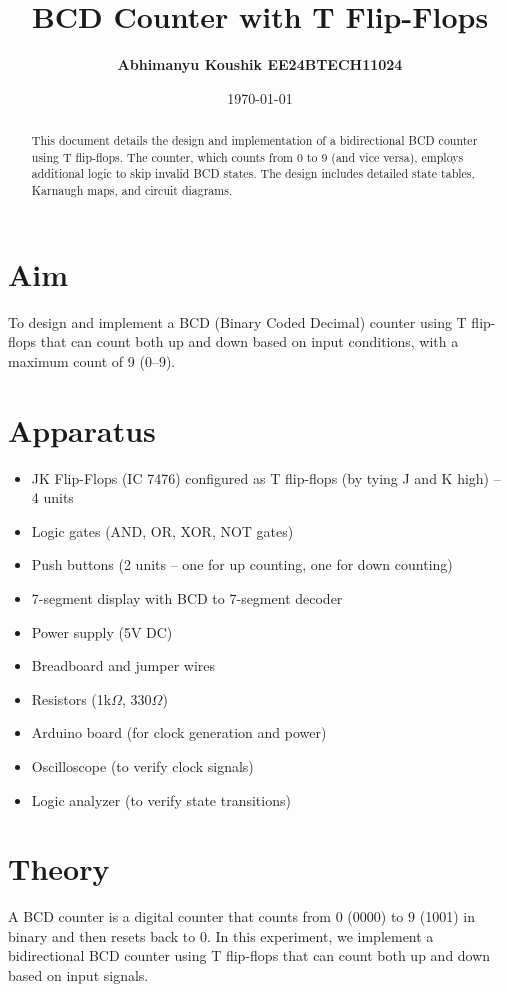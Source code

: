 \documentclass[12pt]{article}
\title{\textbf{BCD Counter with T Flip-Flops}}
\author{\textbf{Abhimanyu Koushik EE24BTECH11024}}
\date{\today}
\begin{document}
\maketitle
\thispagestyle{fancy}

\begin{abstract}
This document details the design and implementation of a bidirectional BCD counter using T flip-flops. The counter, which counts from 0 to 9 (and vice versa), employs additional logic to skip invalid BCD states. The design includes detailed state tables, Karnaugh maps, and circuit diagrams.
\end{abstract}

\section*{Aim}
To design and implement a BCD (Binary Coded Decimal) counter using T flip-flops that can count both up and down based on input conditions, with a maximum count of 9 (0--9).

\section*{Apparatus}
\begin{itemize}
    \item JK Flip-Flops (IC 7476) configured as T flip-flops (by tying J and K high) -- 4 units
    \item Logic gates (AND, OR, XOR, NOT gates)
    \item Push buttons (2 units -- one for up counting, one for down counting)
    \item 7-segment display with BCD to 7-segment decoder
    \item Power supply (5V DC)
    \item Breadboard and jumper wires
    \item Resistors (1k$\Omega$, 330$\Omega$)
    \item Arduino board (for clock generation and power)
    \item Oscilloscope (to verify clock signals)
    \item Logic analyzer (to verify state transitions)
\end{itemize}

\section*{Theory}
A BCD counter is a digital counter that counts from 0 (0000) to 9 (1001) in binary and then resets back to 0. In this experiment, we implement a bidirectional BCD counter using T flip-flops that can count both up and down based on input signals.
\end{document}
